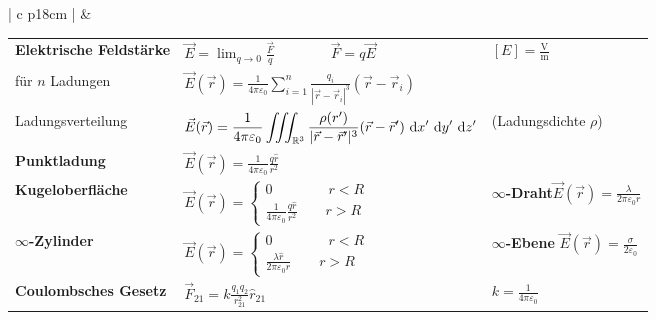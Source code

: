 
		\begin{tabular}{ | c   p{18cm} |}
			\hline
			\rotcell{\large\textbf{\textcolor{white}{Elektrostatik}}}  &
			\setlength{\extrarowheight}{10pt}	
					
			\begin{tabular}{L{5cm} L{6.5cm} L{5.3cm}}
				
			\textbf{Elektrische Feldstärke}&
			$\displaystyle \vec{E}=\lim _{q \rightarrow 0} \frac{\vec{F}}{q} \qquad\qquad \vec{F}=q \vec{E}$
			&
			$\displaystyle[E]=\frac{\mathrm{V}}{\mathrm{m}}$ \\[5pt]
			für $n$ Ladungen&$\displaystyle \vec{E}(\vec{r}) = \frac{1}{4\pi\varepsilon_0} \sum_{i=1}^{n} \frac{q_i}{|\vec{r}-\vec{r}_i|^3}(\vec{r}-\vec{r}_i)$ &\\
			Ladungsverteilung&$\displaystyle	\vec{E}(\vec{r}) = \frac{1}{4\pi\varepsilon_0} \iiint_{\mathbb{R}^3} \frac{\rho(r')}{|\vec{r}-\vec{r}'|^3}(\vec{r}-\vec{r}') \mathop{} \mathrm{d} x' \mathop{} \mathrm{d} y' \mathop{} \mathrm{d} z' $&(Ladungsdichte $\rho$)\\
			

			\textbf{Punktladung}&
			$\displaystyle \vec{E}(\vec{r}) = \frac{1}{4\pi\varepsilon_0} \frac{q\hat{r}}{r^2}$ & \\
			
			\textbf{Kugeloberfläche}&
			$\displaystyle \vec{E}(\vec{r})= \begin{cases}0 \qquad\qquad r<R \\ \displaystyle\frac{1}{4 \pi \varepsilon_{0}} \frac{q \hat{r}}{r^{2}} \qquad r>R\end{cases}$&
			
			\textbf{$\infty$-Draht}\qquad $\displaystyle \vec{E}(\vec{r})= \frac{\lambda}{2\pi\varepsilon_0r}$\\
		
			\textbf{$\infty$-Zylinder}&
			$\displaystyle \vec{E}(\vec{r})= \begin{cases}0 \qquad\qquad r<R \\ \displaystyle \frac{\lambda \hat{r}}{2 \pi \varepsilon_{0} r} \qquad r>R\end{cases}$&
			
	
			\textbf{$\infty$-Ebene}\qquad
			$\displaystyle \vec{E}(\vec{r})=\frac{\sigma}{2\varepsilon_0}$\\
			
			
			
							
			\textbf{Coulombsches Gesetz} &
			$\displaystyle \vec{F}_{21}=k \frac{q_{1} q_{2}}{r_{21}^{2}} \hat{r}_{21}$&
			 $\displaystyle k=\frac{1}{4 \pi \varepsilon_{0}}$\\[10pt]
				

\end{tabular}
\end{tabular}
